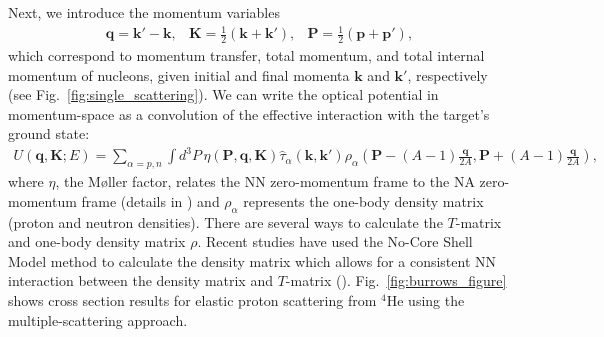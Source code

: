 \documentclass[preprintnumbers,floatfix,aps,prc,preprint,nofootinbib]{revtex4-1}
\begin{document}
Next, we introduce the momentum variables
%
\begin{subequations}
	\label{eq:momenta}
	\begin{eqnarray}
		\label{eq:momentum_transfer}
		\textbf{q} = \textbf{k}' - \textbf{k},
	\end{eqnarray}
	\begin{eqnarray}
		\label{eq:total_momentum}
		\textbf{K} = \frac{1}{2} ( \textbf{k} + \textbf{k}' ),
	\end{eqnarray}
	\begin{eqnarray}
		\label{eq:internal_momentum}
		\textbf{P} = \frac{1}{2} ( \textbf{p} + \textbf{p}' ),
	\end{eqnarray}
\end{subequations}
%
which correspond to momentum transfer, total momentum, and total internal momentum of nucleons, given initial and final momenta $\textbf{k}$ and $\textbf{k}'$, respectively (see Fig.~\ref{fig:single_scattering}). We can write the optical potential in momentum-space as a convolution of the effective interaction with the target's ground state:
%
\begin{eqnarray}
	\label{eq:ms_optical_potential}
	U(\textbf{q}, \textbf{K}; E) = \sum_{\alpha = p, n} \int d^3 P \, \eta(\textbf{P}, \textbf{q}, \textbf{K}) \hat{\tau}_{\alpha}(\textbf{k}, \textbf{k}') \rho_{\alpha}(\textbf{P} - (A-1) \frac{\textbf{q}}{2 A}, \textbf{P} + (A-1) \frac{\textbf{q}}{2 A}),
\end{eqnarray}
%
where $\eta$, the M\o ller factor, relates the NN zero-momentum frame to the NA zero-momentum frame (details in \cite{Elster:1996xh}) and $\rho_{\alpha}$ represents the one-body density matrix (proton and neutron densities). There are several ways to calculate the $T$-matrix and one-body density matrix $\rho$. Recent studies have used the No-Core Shell Model method to calculate the density matrix which allows for a consistent NN interaction between the density matrix and $T$-matrix (\cite{Burrows:2018ggt, Gennari:2017yez}). Fig.~\ref{fig:burrows_figure} shows cross section results for elastic proton scattering from $^{4}$He using the multiple-scattering approach. 
\\
\end{document}
